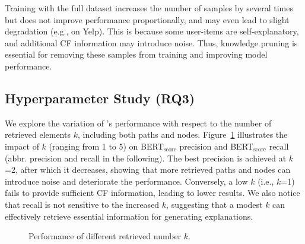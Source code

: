 Training with the full dataset increases the number of samples by several times but does not improve performance proportionally, and may even lead to slight degradation (e.g., on Yelp). This is because some user-items are self-explanatory, and additional CF information may introduce noise. Thus, knowledge pruning is essential for removing these samples from training and improving model performance.


\subsection{Hyperparameter Study (RQ3)}

We explore the variation of \model's performance with respect to the number of retrieved elements $k$, including both paths and nodes. Figure~\ref{fig:hyper_k} illustrates the impact of $k$ (ranging from 1 to 5) on BERT${_\text{score}}$ precision and BERT${_\text{score}}$ recall (abbr. precision and recall in the following). The best precision is achieved at $k$=2, after which it decreases, showing that more retrieved paths and nodes can introduce noise and deteriorate the performance. Conversely, a low $k$ (i.e., $k$=1) fails to provide sufficient CF information, leading to lower results. We also notice that recall is not sensitive to the increased $k$, suggesting that a modest $k$ can effectively retrieve essential information for generating explanations.

\begin{figure}[t]
    \centering
    \vspace{-7mm}
    \caption{Performance of different retrieved number $k$.} 
    \label{fig:hyper_k}
    \vspace{-4mm}
\end{figure}




